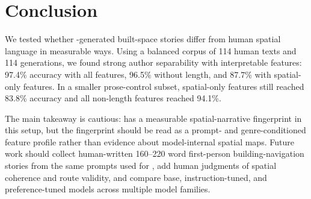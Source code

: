\section{Conclusion}
\label{sec:conclusion}

We tested whether \llm-generated built-space stories differ from human spatial language in measurable ways. Using a balanced corpus of 114 human texts and 114 \gptmini generations, we found strong author separability with interpretable features: 97.4\% accuracy with all features, 96.5\% without length, and 87.7\% with spatial-only features. In a smaller \writingprompts prose-control subset, spatial-only features still reached 83.8\% accuracy and all non-length features reached 94.1\%.

The main takeaway is cautious: \gptmini has a measurable spatial-narrative fingerprint in this setup, but the fingerprint should be read as a prompt- and genre-conditioned feature profile rather than evidence about model-internal spatial maps. Future work should collect human-written 160--220 word first-person building-navigation stories from the same prompts used for \llms, add human judgments of spatial coherence and route validity, and compare base, instruction-tuned, and preference-tuned models across multiple model families.

